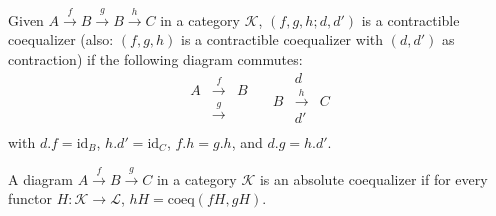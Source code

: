 Given $A \xrightarrow{f} B \xrightarrow{g} B \xrightarrow{h} C$ in a category $\mathcal{K}$, $(f, g, h; d, d')$ is a contractible coequalizer (also: $(f, g, h)$ is a contractible coequalizer with $(d, d')$ as contraction) if the following diagram commutes:
\[
\begin{array}{ccc}
A & \xrightarrow{f} & B \\
& \xrightarrow{g} & \\
\end{array}
\quad
\begin{array}{ccc}
& d & \\
B & \xrightarrow{h} & C \\
& d' & \\
\end{array}
\]
with $d.f = \mathrm{id}_B$, $h.d' = \mathrm{id}_C$, $f.h = g.h$, and $d.g = h.d'$.

A diagram $A \xrightarrow{f} B \xrightarrow{g} C$ in a category $\mathcal{K}$ is an absolute coequalizer if for every functor $H: \mathcal{K} \longrightarrow \mathcal{L}$, $hH = \mathrm{coeq}(fH, gH)$.

